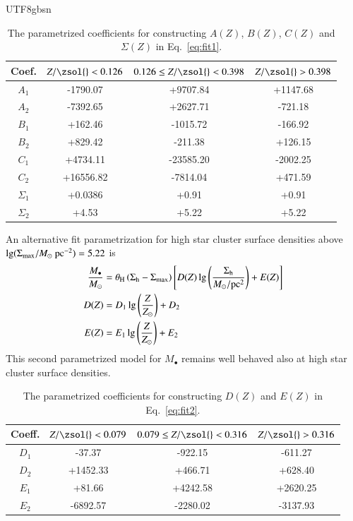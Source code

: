 \documentclass[trackchanges, twocolappendix, twocolumn]{aastex701}
\begin{document}
\begin{CJK*}{UTF8}{gbsn}
\begin{table} \centering \begin{tabular}{cccc} \toprule
Coef. & $Z/\zsol{}<0.126$ & $0.126 \leq Z/\zsol{} < 0.398$  & $Z/\zsol{} > 0.398$\\
\hline
$A_\mathrm{1}$ & -1790.07 & +9707.84 & +1147.68 \\ 
$A_\mathrm{2}$ & -7392.65 & +2627.71 & -721.18 \\ 
$B_\mathrm{1}$ & +162.46 & -1015.72 & -166.92 \\ 
$B_\mathrm{2}$ & +829.42 & -211.38 & +126.15 \\ 
$C_\mathrm{1}$ & +4734.11 & -23585.20 & -2002.25 \\ 
$C_\mathrm{2}$ & +16556.82 & -7814.04 & +471.59 \\ 
$\Sigma_\mathrm{1}$ & +0.0386 & +0.91 & +0.91 \\ 
$\Sigma_\mathrm{2}$ & +4.53 & +5.22 & +5.22 \\ 
         \hline
    \end{tabular}
\caption{The parametrized coefficients for constructing $A(Z)$, $B(Z)$, $C(Z)$ and $\Sigma(Z)$ in Eq.~\ref{eq:fit1}.}
\label{tab:coef1}
\end{table}

An alternative fit parametrization for high star cluster surface densities above $\lg (\Sigma_{\rm max} / M_\odot~{\rm pc}^{-2}) = 5.22$ is
\begin{align}
\dfrac{M_\bullet}{M_\odot} & = \theta_{\rm H} \left( \Sigma_{\rm h} - \Sigma_{\rm max} \right) \left[ D (Z) \lg \left( \dfrac{\Sigma_{\rm h}}{M_\odot/{\rm pc}^2} \right) + E (Z) \right] \label{eq:fit2} \\
D (Z) & = D_1 \lg \left( \dfrac{Z}{Z_\odot} \right) + D_2 \label{eq:D_Z} \\
E (Z) & = E_1 \lg \left( \dfrac{Z}{Z_\odot} \right) + E_2 \label{eq:E_Z}
\end{align}
This second parametrized model for $M_\bullet$ remains well behaved also at high star cluster surface densities.

\begin{table} \centering \begin{tabular}{cccc}
        \hline
         Coeff. & $Z/\zsol{}<0.079$ & $0.079 \leq Z/\zsol{} < 0.316$  & $Z/\zsol{} > 0.316$\\
         \hline
$D_\mathrm{1}$ & -37.37 & -922.15 & -611.27 \\ 
$D_\mathrm{2}$ & +1452.33 & +466.71 & +628.40 \\ 
$E_\mathrm{1}$ & +81.66 & +4242.58 & +2620.25 \\ 
$E_\mathrm{2}$ & -6892.57 & -2280.02 & -3137.93 \\
         \hline
\end{tabular}
\caption{The parametrized coefficients for constructing $D(Z)$ and $E(Z)$ in Eq.~\ref{eq:fit2}.}
\label{tab:coef2}
\end{table}


\end{CJK*}
\end{document}
